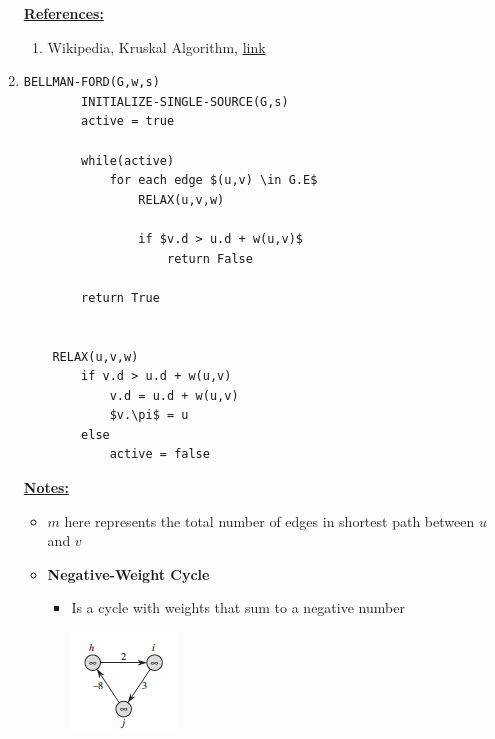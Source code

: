 \documentclass[12pt]{article}
\begin{document}
\begin{enumerate}[1.]
    \bigskip

    \underline{\textbf{References:}}

    \bigskip

    \begin{enumerate}[1)]
        \item Wikipedia, Kruskal Algorithm, \href{https://en.wikipedia.org/wiki/Kruskal%27s_algorithm}{link}
    \end{enumerate}

    \item

    \bigskip

    \begin{lstlisting}[mathescape=true]
    BELLMAN-FORD(G,w,s)
        INITIALIZE-SINGLE-SOURCE(G,s)
        active = true

        while(active)
            for each edge $(u,v) \in G.E$
                RELAX(u,v,w)

                if $v.d > u.d + w(u,v)$
                    return False

        return True


    RELAX(u,v,w)
        if v.d > u.d + w(u,v)
            v.d = u.d + w(u,v)
            $v.\pi$ = u
        else
            active = false
    \end{lstlisting}

    \bigskip

    \underline{\textbf{Notes:}}

    \bigskip

    \begin{itemize}
        \item $m$ here represents the total number of edges in shortest path
        between $u$ and $v$
        \item \textbf{Negative-Weight Cycle}

        \begin{itemize}
            \item Is a cycle with weights that sum to a negative number

            \begin{center}
            \includegraphics[width=0.35\linewidth]{images/worksheet_4_solution_43.png}
            \end{center}
        \end{itemize}



\end{itemize}
\end{enumerate}
\end{document}
